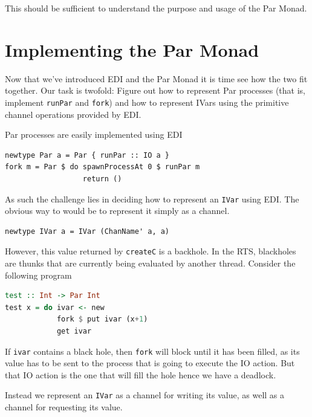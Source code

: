 \documentclass[a4paper, oneside, final]{memoir}
\begin{document}
This should be sufficient to understand the purpose and usage of the
Par Monad.

\newpage

\section{Implementing the Par Monad}

Now that we've introduced EDI and the Par Monad it is time see how 
the two fit together. Our task is twofold: Figure out how to 
represent Par processes (that is, implement \texttt{runPar} and 
\texttt{fork}) and how to represent IVars using the primitive
channel operations provided by EDI.

Par processes are easily implemented using EDI \newline

\begin{lstlisting}
newtype Par a = Par { runPar :: IO a }
fork m = Par $ do spawnProcessAt 0 $ runPar m
                  return ()
\end{lstlisting}

As such the challenge lies in deciding how to represent an \texttt{IVar}
using EDI. The obvious way to would be to represent it simply as a
channel. \newline

\begin{lstlisting}
newtype IVar a = IVar (ChanName' a, a)
\end{lstlisting}

However, this value returned by \texttt{createC} is a backhole. In 
the RTS, blackholes are thunks that are currently being evaluated by
another thread. Consider the following program \newline 

\begin{lstlisting}[language=Haskell]
test :: Int -> Par Int
test x = do ivar <- new
            fork $ put ivar (x+1)
            get ivar
\end{lstlisting}

If \texttt{ivar} contains a black hole, then \texttt{fork} will block
until it has been filled, as its value has to be sent to the process
that is going to execute the IO action.  But that IO action is the one
that will fill the hole hence we have a deadlock.

Instead we represent an \texttt{IVar} as a channel for writing its
value, as well as a channel for requesting its value. \newline
\end{document}

